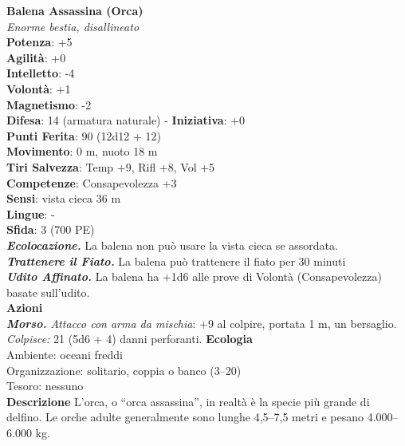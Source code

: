 \begin{multicols}{2}
\medskip\textbf{Balena Assassina (Orca)}\\
\emph{Enorme bestia, disallineato}\\
\textbf{Potenza}: +5\\
\textbf{Agilità}: +0\\
\textbf{Intelletto}: -4\\
\textbf{Volontà}: +1\\
\textbf{Magnetismo}: -2\\
\textbf{Difesa}: 14 (armatura naturale) - \textbf{Iniziativa}: +0\\
\textbf{Punti Ferita}: 90 (12d12 + 12)\\
\textbf{Movimento}: 0 m, nuoto 18 m\\
\textbf{Tiri Salvezza}: Temp +9, Rifl +8, Vol +5\\
\textbf{Competenze}: Consapevolezza +3\\
\textbf{Sensi}: vista cieca 36 m\\
\textbf{Lingue}: -\\
\textbf{Sfida}: 3 (700 PE)\smallskip\\
\emph{\textbf{Ecolocazione.}} La balena non può usare la vista cieca se assordata.\\
\emph{\textbf{Trattenere il Fiato.}} La balena può trattenere il fiato per 30 minuti\\
\emph{\textbf{Udito Affinato.}} La balena ha +1d6 alle prove di Volontà (Consapevolezza) basate sull'udito.\\
\smallskip\textbf{Azioni}\\
\emph{\textbf{Morso.} Attacco con arma da mischia}: +9 al colpire, portata 1 m, un bersaglio.\\
\emph{Colpisce:} 21 (5d6 + 4) danni perforanti.
\textbf{Ecologia}\\
Ambiente: oceani freddi\\
Organizzazione: solitario, coppia o banco (3–20)\\
Tesoro: nessuno\\
\textbf{Descrizione}
L’orca, o “orca assassina”, in realtà è la specie più grande di delfino. Le orche adulte generalmente sono lunghe 4,5–7,5 metri e pesano 4.000–6.000 kg.\\


\end{multicols}
